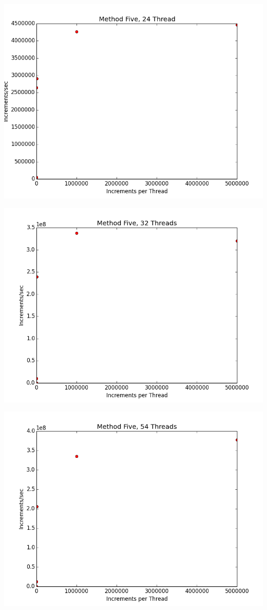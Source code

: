 \documentclass[12pt]{article}
\begin{document}
\includegraphics[scale=.5]{Graphs/MethodFive_24Thread.png}

\includegraphics[scale=.5]{Graphs/MethodFive_32Thread.png}

\includegraphics[scale=.5]{Graphs/MethodFive_54Thread.png}
\end{document}
